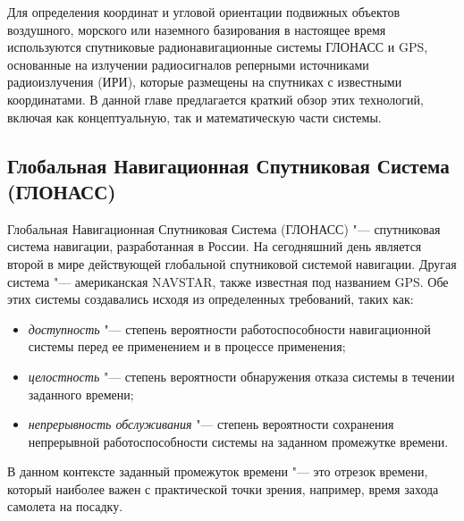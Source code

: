 \documentclass[../main.tex]{subfiles}
\begin{document}

Для определения координат и угловой ориентации подвижных объектов воздушного, морского или наземного базирования в настоящее время используются спутниковые радионавигационные системы ГЛОНАСС и GPS, основанные на излучении радиосигналов реперными источниками радиоизлучения (ИРИ), которые размещены на спутниках с известными координатами. В данной главе предлагается краткий обзор этих технологий, включая как концептуальную, так и математическую части системы.

\subsection{Глобальная Навигационная Спутниковая Система (ГЛОНАСС)}
Глобальная Навигационная Спутниковая Система (ГЛОНАСС) "--- спутниковая система навигации, разработанная в России. На сегодняшний день является второй в мире действующей глобальной спутниковой системой навигации. Другая система "--- американская NAVSTAR, также известная под названием GPS. Обе этих системы создавались исходя из определенных требований, таких как:
\begin{itemize}
    \item \textit{доступность} "--- степень вероятности работоспособности навигационной системы перед ее применением и в процессе применения;
    \item \textit{целостность} "--- степень вероятности обнаружения отказа системы в течении заданного времени;
    \item \textit{непрерывность обслуживания} "--- степень вероятности сохранения непрерывной работоспособности системы на заданном промежутке времени.
\end{itemize}
В данном контексте заданный промежуток времени "--- это отрезок времени, который наиболее важен с практической точки зрения, например, время захода самолета на посадку.
\end{document}
